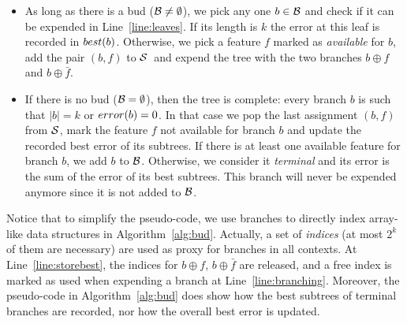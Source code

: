 \documentclass{llncs}
\newcommand{\nodes}[0]{\ensuremath{{\cal N}}}
\newcommand{\bud}[0]{\ensuremath{{\cal B}}}
\newcommand{\sequence}[0]{\ensuremath{{\cal S}}}
\newcommand{\maxd}[0]{\ensuremath{k}}
\newcommand{\afeat}[0]{\ensuremath{f}}
\newcommand{\best}[1][]{\ensuremath{\ifthenelse{\equal{#1}{}}{{best}}{{best({#1})}}}}
\newcommand{\error}[1][]{\ensuremath{\ifthenelse{\equal{#1}{}}{{error}}{{error({{#1}})}}}}
\newcommand{\abranch}[0]{\ensuremath{b}}
\newcommand{\mdepth}[0]{\ensuremath{k}}
\newcommand{\grow}[2]{\ensuremath{{#1}\oplus{#2}}}
\begin{document}
\begin{itemize}
	\item As long as there is a bud ($\bud \neq \emptyset$), we pick any one $\abranch \in \bud$ and check if it can be expended in Line~\ref{line:leaves}. If its length is $\mdepth$ the error at this leaf is recorded in $\best[\abranch]$. Otherwise, we pick a feature $\afeat$ marked as \emph{available} for \abranch, add the pair $(\abranch,\afeat)$ to \sequence\ and expend the tree with the two branches $\grow{\abranch}{\afeat}$ and $\grow{\abranch}{\bar{\afeat}}$. 

\item If there is no bud ($\bud = \emptyset$), then the tree is complete: every branch $\abranch$ is such that $|\abranch| = \mdepth$ or $\error[\abranch]=0$. In that case we pop the last assignment $(\abranch,\afeat)$ from \sequence, mark the feature $\afeat$ not available for branch $\abranch$ and update the recorded best error of its subtrees. If there is at least one available feature for branch $\abranch$, we add $\abranch$ to $\bud$. 
Otherwise, we consider it \emph{terminal} and its error is the sum of the error of its best subtrees. This branch will never be expended anymore since it is not added to $\bud$.

\end{itemize}


Notice that to simplify the pseudo-code, we use branches to directly index array-like data structures in Algorithm~\ref{alg:bud}. Actually, a set of \emph{indices} (at most $2^{\mdepth}$ of them are necessary) are used as proxy for branches in all contexts. At Line~\ref{line:storebest}, the indices for $\grow{\abranch}{\afeat}$, $\grow{\abranch}{\bar{\afeat}}$ are released, and a free index is marked as used when expending a branch at Line~\ref{line:branching}. Moreover, the pseudo-code in Algorithm~\ref{alg:bud} does show how the best subtrees of terminal branches are recorded, nor how the overall best error is updated.
\end{document}
